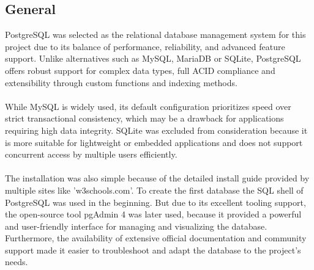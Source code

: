 \documentclass[a4paper,12pt]{report}
\begin{document}
\subsection{General}
PostgreSQL was selected as the relational database management system for this project due to its balance of performance, reliability, and advanced feature support. Unlike alternatives such as MySQL, MariaDB or SQLite, PostgreSQL offers robust support for complex data types, full ACID compliance and extensibility through custom functions and indexing methods. \parencite{postgresdocs}\\\\
While MySQL is widely used, its default configuration prioritizes speed over strict transactional consistency, which may be a drawback for applications requiring high data integrity. SQLite was excluded from consideration because it is more suitable for lightweight or embedded applications and does not support concurrent access by multiple users efficiently. \parencite{postgresvsMysql}\\\\
The installation was also simple because of the detailed install guide provided by multiple sites like 'w3schools.com'. To create the first database the SQL shell of PostgreSQL was used in the beginning. But due to its excellent tooling support, the open-source tool pgAdmin 4 was later used, because it  provided a powerful and user-friendly interface for managing and visualizing the database. Furthermore, the availability of extensive official documentation and community support made it easier to troubleshoot and adapt the database to the project’s needs. \parencite{pgAdmin} \parencite{pgsinstallation} \\
\end{document}

